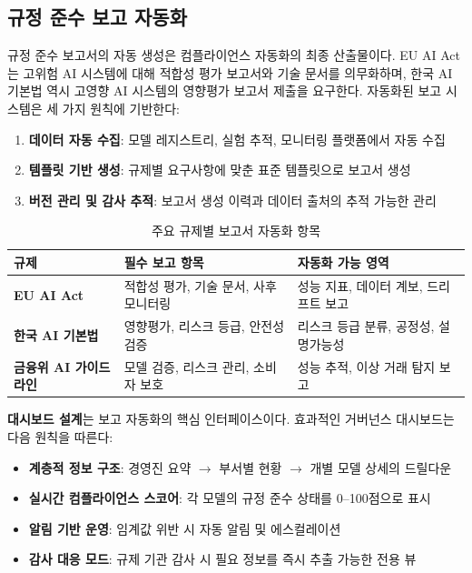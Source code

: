 \subsection{규정 준수 보고 자동화}
\label{sec:14.4.3}

규정 준수 보고서의 자동 생성은 컴플라이언스 자동화의 최종 산출물이다. EU AI Act\cite{eu_ai_act}는 고위험 AI 시스템에 대해 적합성 평가 보고서와 기술 문서를 의무화하며, 한국 AI 기본법\cite{cset2025korea_ai_act} 역시 고영향 AI 시스템의 영향평가 보고서 제출을 요구한다. 자동화된 보고 시스템은 세 가지 원칙에 기반한다:

\begin{enumerate}
    \item \textbf{데이터 자동 수집}: 모델 레지스트리, 실험 추적, 모니터링 플랫폼에서 자동 수집
    \item \textbf{템플릿 기반 생성}: 규제별 요구사항에 맞춘 표준 템플릿으로 보고서 생성
    \item \textbf{버전 관리 및 감사 추적}: 보고서 생성 이력과 데이터 출처의 추적 가능한 관리
\end{enumerate}

\begin{table}[htbp]
\centering
\caption{주요 규제별 보고서 자동화 항목}
\label{tab:14_compliance_reports}
\begin{tabularx}{\textwidth}{lXX}
\toprule
\textbf{규제} & \textbf{필수 보고 항목} & \textbf{자동화 가능 영역} \\
\midrule
\textbf{EU AI Act} & 적합성 평가, 기술 문서, 사후 모니터링 & 성능 지표, 데이터 계보, 드리프트 보고 \\
\textbf{한국 AI 기본법} & 영향평가, 리스크 등급, 안전성 검증 & 리스크 등급 분류, 공정성, 설명가능성 \\
\textbf{금융위 AI 가이드라인} & 모델 검증, 리스크 관리, 소비자 보호 & 성능 추적, 이상 거래 탐지 보고 \\
\bottomrule
\end{tabularx}
\end{table}

\textbf{대시보드 설계}는 보고 자동화의 핵심 인터페이스이다. 효과적인 거버넌스 대시보드는 다음 원칙을 따른다:

\begin{itemize}
    \item \textbf{계층적 정보 구조}: 경영진 요약 $\rightarrow$ 부서별 현황 $\rightarrow$ 개별 모델 상세의 드릴다운
    \item \textbf{실시간 컴플라이언스 스코어}: 각 모델의 규정 준수 상태를 0--100점으로 표시
    \item \textbf{알림 기반 운영}: 임계값 위반 시 자동 알림 및 에스컬레이션
    \item \textbf{감사 대응 모드}: 규제 기관 감사 시 필요 정보를 즉시 추출 가능한 전용 뷰
\end{itemize}

